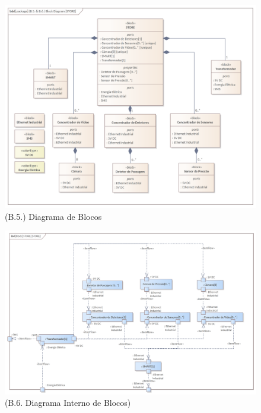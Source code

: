 \documentclass[12pt,a4paper]{article}
\begin{document}
\begin{landscape}
  \begin{figure}
    \centering
    \includegraphics[width=1.2\textwidth]{assets/ea-bdd-store.png}
    \caption{(B.5.) Diagrama de Blocos}
    \label{fig:bbd}
  \end{figure}
\end{landscape}

\begin{landscape}
  \begin{figure}
    \centering
    \includegraphics[width=1.6\textwidth]{assets/ea-ibd-store.png}
    \caption{(B.6. Diagrama Interno de Blocos)}
    \label{fig:ibd}
  \end{figure}
\end{landscape}
\end{document}
